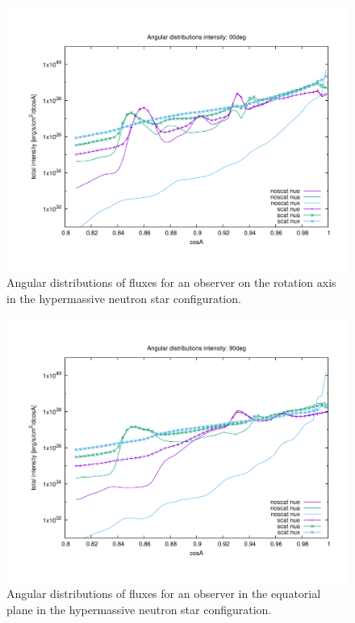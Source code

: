 \documentclass[aps,floatfix,prd,superscriptaddress,twocolumn]{revtex4-1}
\begin{document}
\begin{figure}
  \includegraphics[width=\columnwidth]{cosA_distrib-intensity-250km-00deg}
  \caption{Angular distributions of fluxes for an observer on the rotation axis
    in the hypermassive neutron star configuration.}
  \label{fig:nsns_cosA_distrib_I_00deg}
\end{figure}

\begin{figure}
  \includegraphics[width=\columnwidth]{cosA_distrib-intensity-250km-90deg}
  \caption{Angular distributions of fluxes for an observer in the equatorial
    plane in the hypermassive neutron star configuration.}
  \label{fig:nsns_cosA_distrib_I_90deg}
\end{figure}
\end{document}
